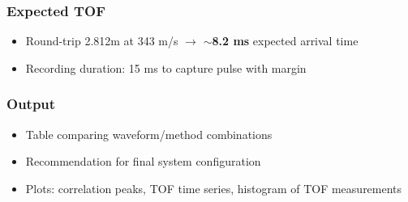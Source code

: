 \documentclass[11pt]{article}
\begin{document}
\subsubsection{Expected TOF}
\begin{itemize}
    \item Round-trip 2.812m at 343 m/s $\rightarrow$ \textbf{$\sim$8.2 ms} expected arrival time
    \item Recording duration: 15 ms to capture pulse with margin
\end{itemize}

\subsubsection{Output}
\begin{itemize}
    \item Table comparing waveform/method combinations
    \item Recommendation for final system configuration
    \item Plots: correlation peaks, TOF time series, histogram of TOF measurements
\end{itemize}
\end{document}
